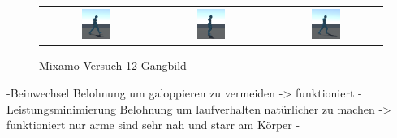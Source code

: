 \begin{figure}[H]
\begin{tabular}{ccc}
    \includegraphics[width=0.27\textwidth]{img/mixamo_laufen_energiespar4.png}  & \includegraphics[width=0.27\textwidth]{img/mixamo_laufen_energiespar5.png}  & \includegraphics[width=0.27\textwidth]{img/mixamo_laufen_energiespar6.png} \\
  \end{tabular}
  \caption{Mixamo Versuch 12 Gangbild}
  \label{fig:mixamo_versuch12_gangbild}
\end{figure}

-Beinwechsel Belohnung um galoppieren zu vermeiden -> funktioniert
-Leistungsminimierung Belohnung um laufverhalten natürlicher zu machen -> funktioniert nur arme sind sehr nah und starr am Körper
-